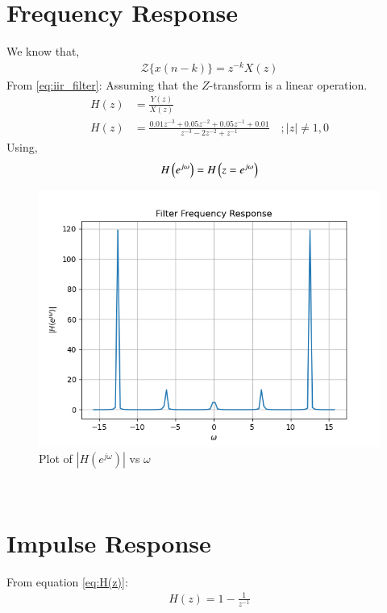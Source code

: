 \documentclass[journal,12pt,twocolumn]{IEEEtran}
\theoremstyle{remark}
\begin{document}
\section{Frequency Response}
\noindent We know that,
\begin{align}
\label{eq:z_trans_shift}
	{\mathcal {Z}}\{x(n-k)\} = z^{-k}X(z)
\end{align}
From  \eqref{eq:iir_filter}: Assuming that the $Z$-transform is a linear operation.
\begin{align}
    H(z) &= \frac{Y(z)}{X(z)}\\
    H(z) &= \frac{0.01z^{-3} + 0.05z^{-2}+0.05z^{-1}+0.01}{z^{-3}-2z^{-2}+z^{-1}} \quad ;|z|\neq 1,0\label{eq:H(z)}
\end{align}
Using,
\begin{align}
    H\left(e^{j \omega}\right) = H\left(z = e^{j \omega}\right)
\end{align}
\begin{figure}[htbp] 
\centering
\includegraphics[width=\columnwidth]{figs/|H(z)|.png}
\caption{Plot of $|H(e^{j\omega})|$ vs $\omega$}
\end{figure}\\
\section{Impulse Response}
From equation \eqref{eq:H(z)}:
\begin{align}
    H(z) = 1 - \frac{1}{z^{-1}}
\end{align}
\end{document}
